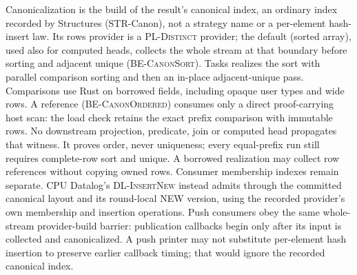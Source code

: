 Canonicalization is the build of the result's canonical index, an ordinary
index recorded by Structures (STR-Canon), not a strategy name or a
per-element hash-insert law. Its rows provider is a \textsc{PL-Distinct}
provider; the default  (sorted array), used also for
computed heads, collects the whole stream at that boundary before
sorting and adjacent unique (\textsc{BE-CanonSort}). Tasks realizes the sort with parallel comparison
sorting and then an in-place adjacent-unique pass. Comparisons use Rust
 on borrowed fields, including opaque user types and wide rows.
A  reference (\textsc{BE-CanonOrdered}) consumes only a direct proof-carrying host scan: the load check
retains the exact prefix comparison with immutable rows. No downstream
projection, predicate, join or computed head propagates that witness.
It proves order, never uniqueness; every equal-prefix run still requires
complete-row sort and unique. A borrowed realization may collect row
references without copying owned rows. Consumer membership indexes remain
separate. CPU Datalog's \textsc{DL-InsertNew} instead admits through the
committed canonical layout and its round-local NEW version, using the
recorded provider's own membership and insertion operations.
Push consumers obey the same whole-stream provider-build barrier: publication
callbacks begin only after its input is collected and canonicalized. A push
printer may not substitute per-element hash insertion to preserve earlier
callback timing; that would ignore the recorded canonical index.

